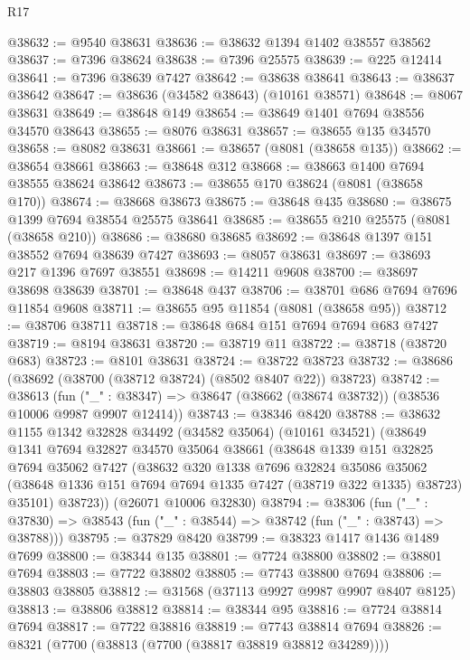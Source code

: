 \begin{lexlean}{R17}
\begin{coremodule}
@38632 := @9540 @38631
@38636 := @38632 @1394 @1402 @38557 @38562
@38637 := @7396 @38624
@38638 := @7396 @25575
@38639 := @225 @12414
@38641 := @7396 @38639 @7427
@38642 := @38638 @38641
@38643 := @38637 @38642
@38647 := @38636 (@34582 @38643) (@10161 @38571)
@38648 := @8067 @38631
@38649 := @38648 @149
@38654 := @38649 @1401 @7694 @38556 @34570 @38643
@38655 := @8076 @38631
@38657 := @38655 @135 @34570
@38658 := @8082 @38631
@38661 := @38657 (@8081 (@38658 @135))
@38662 := @38654 @38661
@38663 := @38648 @312
@38668 := @38663 @1400 @7694 @38555 @38624 @38642
@38673 := @38655 @170 @38624 (@8081 (@38658 @170))
@38674 := @38668 @38673
@38675 := @38648 @435
@38680 := @38675 @1399 @7694 @38554 @25575 @38641
@38685 := @38655 @210 @25575 (@8081 (@38658 @210))
@38686 := @38680 @38685
@38692 := @38648 @1397 @151 @38552 @7694 @38639 @7427
@38693 := @8057 @38631
@38697 := @38693 @217 @1396 @7697 @38551
@38698 := @14211 @9608
@38700 := @38697 @38698 @38639
@38701 := @38648 @437
@38706 := @38701 @686 @7694 @7696 @11854 @9608
@38711 := @38655 @95 @11854 (@8081 (@38658 @95))
@38712 := @38706 @38711
@38718 := @38648 @684 @151 @7694 @7694 @683 @7427
@38719 := @8194 @38631
@38720 := @38719 @11
@38722 := @38718 (@38720 @683)
@38723 := @8101 @38631
@38724 := @38722 @38723
@38732 := @38686 (@38692 (@38700 (@38712 @38724) (@8502 @8407 @22)) @38723)
@38742 := @38613
    (fun ("_" : @38347) => @38647 (@38662 (@38674 @38732)) (@38536 @10006 @9987 @9907 @12414))
@38743 := @38346 @8420
@38788 := @38632
    @1155
    @1342
    @32828
    @34492
    (@34582 @35064)
    (@10161 @34521)
    (@38649
      @1341
      @7694
      @32827
      @34570
      @35064
      @38661
      (@38648
        @1339
        @151
        @32825
        @7694
        @35062
        @7427
        (@38632
          @320
          @1338
          @7696
          @32824
          @35086
          @35062
          (@38648 @1336 @151 @7694 @7694 @1335 @7427 (@38719 @322 @1335) @38723)
          @35101)
        @38723))
    (@26071 @10006 @32830)
@38794 := @38306
    (fun ("_" : @37830) => @38543 (fun ("_" : @38544) => @38742 (fun ("_" : @38743) => @38788)))
@38795 := @37829 @8420
@38799 := @38323 @1417 @1436 @1489 @7699
@38800 := @38344 @135
@38801 := @7724 @38800
@38802 := @38801 @7694
@38803 := @7722 @38802
@38805 := @7743 @38800 @7694
@38806 := @38803 @38805
@38812 := @31568 (@37113 @9927 @9987 @9907 @8407 @8125)
@38813 := @38806 @38812
@38814 := @38344 @95
@38816 := @7724 @38814 @7694
@38817 := @7722 @38816
@38819 := @7743 @38814 @7694
@38826 := @8321 (@7700 (@38813 (@7700 (@38817 @38819 @38812 @34289))))

\end{coremodule}
\end{lexlean}
